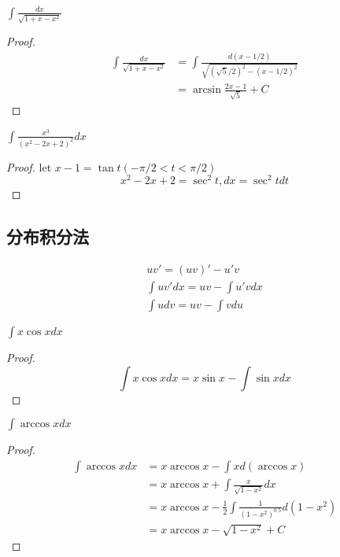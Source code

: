 \documentclass[11pt]{article}
\begin{document}
\begin{proposition}[]
\(\int\frac{dx}{\sqrt{1+x-x^2}}\)
\end{proposition}

\begin{proof}
    \begin{align*}
\int\frac{dx}{\sqrt{1+x-x^2}}&=\int\frac{d(x-1/2)}{\sqrt{(\sqrt{5}/2)^2-(x-1/2)^2}}\\
&=\arcsin\frac{2x-1}{\sqrt{5}}+C
\end{align*}
\end{proof}


\begin{proposition}[]
\(\int\frac{x^3}{(x^2-2x+2)^2}dx\)
\end{proposition}

\begin{proof}
let \(x-1=\tan t(-\pi/2<t<\pi/2)\)
\begin{equation*}
x^2-2x+2=\sec^2t, dx=\sec^2tdt
\end{equation*}
\end{proof}
\subsection{分布积分法}
\label{sec:org9241a23}
\begin{gather*}
uv'=(uv)'-u'v\\
\int uv'dx=uv-\int u'vdx\\
\int udv=uv-\int vdu
\end{gather*}

\begin{proposition}[]
\(\int x\cos xdx\)
\end{proposition}

\begin{proof}
\begin{equation*}
\int x\cos xdx=x\sin x-\int\sin xdx
\end{equation*}
\end{proof}

\begin{proposition}[]
\(\int\arccos xdx\)
\end{proposition}

\begin{proof}
\begin{align*}
\int\arccos xdx&=x\arccos x-\int xd(\arccos x)\\
&=x\arccos x+\int\frac{x}{\sqrt{1-x^2}}dx\\
&=x\arccos x-\frac{1}{2}\int\frac{1}{(1-x^2)^{0.5}}d(1-x^2)\\
&=x\arccos x-\sqrt{1-x^2}+C
\end{align*}
\end{proof}
\end{document}
